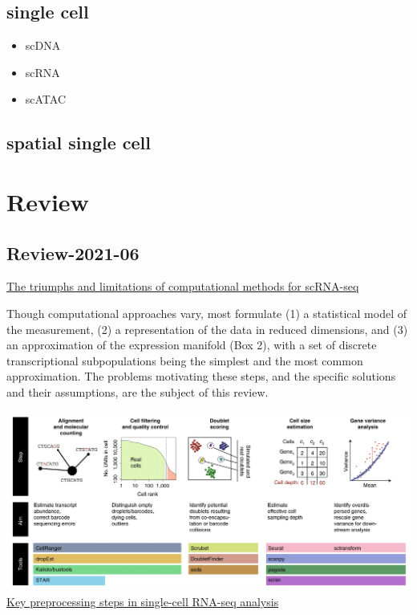 \documentclass[
]{book}
\providecommand{\tightlist}{%
  \setlength{\itemsep}{0pt}\setlength{\parskip}{0pt}}
\begin{document}
\hypertarget{single-cell}{%
\subsection{single cell}\label{single-cell}}

\begin{itemize}
\tightlist
\item
  scDNA
\item
  scRNA
\item
  scATAC
\end{itemize}

\hypertarget{spatial-single-cell}{%
\subsection{spatial single cell}\label{spatial-single-cell}}

\hypertarget{review}{%
\section{Review}\label{review}}

\hypertarget{review-2021-06}{%
\subsection{Review-2021-06}\label{review-2021-06}}

\href{https://www.nature.com/articles/s41592-021-01171-x}{The triumphs and limitations of computational methods for scRNA-seq}\citep{kharchenko2021triumphs}

Though computational approaches vary, most formulate (1) a statistical model of the measurement, (2) a representation of the data in reduced dimensions, and (3) an approximation of the expression manifold (Box 2), with a set of discrete transcriptional subpopulations being the simplest and the most common approximation. The problems motivating these steps, and the specific solutions and their assumptions, are the subject of this review.

\includegraphics{./figs/singleCell/preprocessing_review1.jpg}
\href{https://www.nature.com/articles/s41592-021-01171-x/figures/1}{Key preprocessing steps in single-cell RNA-seq analysis}
\end{document}
